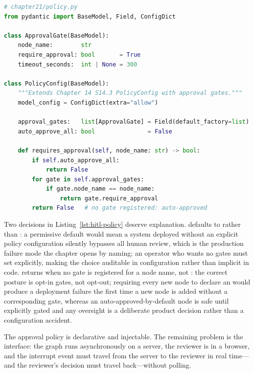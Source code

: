 \begin{lstlisting}[language=Python,
  caption={Approval gate model and policy lookup method},
  label={lst:hitl-policy}]
# chapter21/policy.py
from pydantic import BaseModel, Field, ConfigDict

class ApprovalGate(BaseModel):
    node_name:        str
    require_approval: bool       = True
    timeout_seconds:  int | None = 300

class PolicyConfig(BaseModel):
    """Extends Chapter 14 S14.3 PolicyConfig with approval gates."""
    model_config = ConfigDict(extra="allow")

    approval_gates:   list[ApprovalGate] = Field(default_factory=list)
    auto_approve_all: bool               = False

    def requires_approval(self, node_name: str) -> bool:
        if self.auto_approve_all:
            return False
        for gate in self.approval_gates:
            if gate.node_name == node_name:
                return gate.require_approval
        return False   # no gate registered: auto-approved
\end{lstlisting}

Two decisions in Listing~\ref{lst:hitl-policy} deserve explanation.
 defaults to  rather than :
a permissive default would mean a system deployed without an explicit policy
configuration silently bypasses all human review, which is the production
failure mode the chapter opens by naming; an operator who wants no gates must
set  explicitly, making the choice auditable in
configuration rather than implicit in code.  returns
 when no gate is registered for a node name, not : the
correct posture is opt-in gates, not opt-out; requiring every new node to
declare an  would produce a deployment failure the first
time a new node is added without a corresponding gate, whereas an
auto-approved-by-default node is safe until explicitly gated and any
oversight is a deliberate product decision rather than a configuration
accident.

The approval policy is declarative and injectable. The remaining problem is
the interface: the graph runs asynchronously on a server, the reviewer is
in a browser, and the interrupt event must travel from the server to the
reviewer in real time---and the reviewer's decision must travel
back---without polling.


